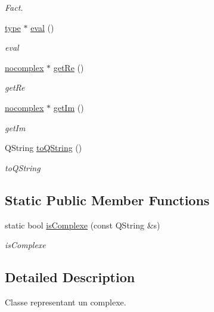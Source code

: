 \begin{DoxyCompactItemize}
\begin{DoxyCompactList}\small\item\em Fact. \end{DoxyCompactList}\item 
\hyperlink{classtype}{type} $\ast$ \hyperlink{classcomplexe_adc5362397311c76d47a8793a14c012c6}{eval} ()
\begin{DoxyCompactList}\small\item\em eval \end{DoxyCompactList}\item 
\hyperlink{classnocomplex}{nocomplex} $\ast$ \hyperlink{classcomplexe_aed1ac631e9354b052b89913a8bc18b1d}{get\-Re} ()
\begin{DoxyCompactList}\small\item\em get\-Re \end{DoxyCompactList}\item 
\hyperlink{classnocomplex}{nocomplex} $\ast$ \hyperlink{classcomplexe_a3a2b9bf78d9e6cdbf2c533c2392fef4c}{get\-Im} ()
\begin{DoxyCompactList}\small\item\em get\-Im \end{DoxyCompactList}\item 
Q\-String \hyperlink{classcomplexe_a5fc10d08facdcbd833d91d0c765c9c18}{to\-Q\-String} ()
\begin{DoxyCompactList}\small\item\em to\-Q\-String \end{DoxyCompactList}\end{DoxyCompactItemize}
\subsection*{Static Public Member Functions}
\begin{DoxyCompactItemize}
\item 
static bool \hyperlink{classcomplexe_a07c21c63b45b23b9e822d7e80e42e27e}{is\-Complexe} (const Q\-String \&s)
\begin{DoxyCompactList}\small\item\em is\-Complexe \end{DoxyCompactList}\end{DoxyCompactItemize}


\subsection{Detailed Description}
Classe representant un complexe. 

